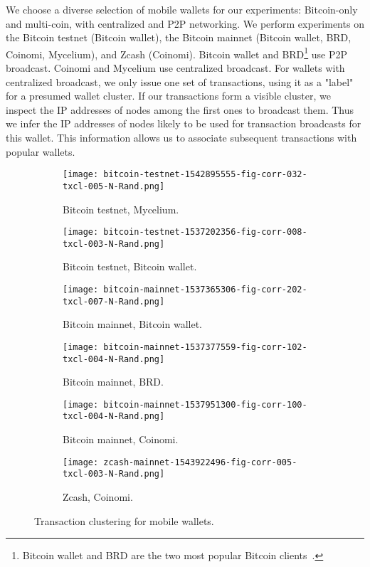 We choose a diverse selection of mobile wallets for our experiments: Bitcoin-only and multi-coin, with centralized and P2P networking.
We perform experiments on the Bitcoin testnet (Bitcoin wallet), the Bitcoin mainnet (Bitcoin wallet, BRD, Coinomi, Mycelium), and Zcash (Coinomi).
Bitcoin wallet and BRD\footnote{Bitcoin wallet and BRD are the two most popular Bitcoin clients~\cite{Wang2017}.} use P2P broadcast.
Coinomi and Mycelium use centralized broadcast.
For wallets with centralized broadcast, we only issue one set of transactions, using it as a "label" for a presumed wallet cluster.
If our transactions form a visible cluster, we inspect the IP addresses of nodes among the first ones to broadcast them.
Thus we infer the IP addresses of nodes likely to be used for transaction broadcasts for this wallet.
This information allows us to associate subsequent transactions with popular wallets.

\begin{figure}
	\centering
	\begin{subfigure}{.5\textwidth}
		\centering
		\texttt{[image: bitcoin-testnet-1542895555-fig-corr-032-txcl-005-N-Rand.png]}
		\caption{Bitcoin testnet, Mycelium.}
	\end{subfigure}%
	\begin{subfigure}{.5\textwidth}
		\centering
		\texttt{[image: bitcoin-testnet-1537202356-fig-corr-008-txcl-003-N-Rand.png]}
		\caption{Bitcoin testnet, Bitcoin wallet.}
	\end{subfigure}
	\begin{subfigure}{.5\textwidth}
		\centering
		\texttt{[image: bitcoin-mainnet-1537365306-fig-corr-202-txcl-007-N-Rand.png]}
		\caption{Bitcoin mainnet, Bitcoin wallet.}
	\end{subfigure}%
	\begin{subfigure}{.5\textwidth}
		\centering
		\texttt{[image: bitcoin-mainnet-1537377559-fig-corr-102-txcl-004-N-Rand.png]}
		\caption{Bitcoin mainnet, BRD.}
	\end{subfigure}
	\begin{subfigure}{.5\textwidth}
		\centering
		\texttt{[image: bitcoin-mainnet-1537951300-fig-corr-100-txcl-004-N-Rand.png]}
		\caption{Bitcoin mainnet, Coinomi.}
	\end{subfigure}%
	\begin{subfigure}{.5\textwidth}
		\centering
		\texttt{[image: zcash-mainnet-1543922496-fig-corr-005-txcl-003-N-Rand.png]}
		\caption{Zcash, Coinomi.}
	\end{subfigure}
	\caption{Transaction clustering for mobile wallets.}
	\label{fig:clustering-all}
\end{figure}

